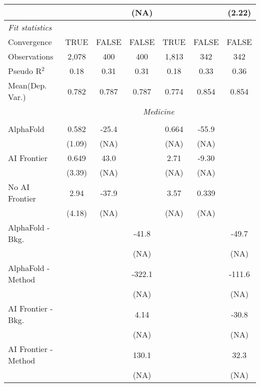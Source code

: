\begin{tabular}{lcccccc}
                           &               &              & (NA)  &               &              & (2.22)\\   
   \midrule
   \emph{Fit statistics}\\
   Convergence             &TRUE           & FALSE        & FALSE & TRUE          & FALSE        & FALSE\\  
   Observations            & 2,078         & 400          & 400   & 1,813         & 342          & 342\\  
   Pseudo R$^2$            & 0.18          & 0.31         & 0.31  & 0.18          & 0.33         & 0.36\\  
   
Mean(Dep. Var.) & 0.782 & 0.787 & 0.787 & 0.774 & 0.854 & 0.854 \\
 & \multicolumn{6}{c}{\textit{Medicine}} \\ \\
   AlphaFold               & 0.582  & -25.4 &        & 0.664 & -55.9 &   \\   
                           & (1.09) & (NA)  &        & (NA)  & (NA)  &   \\   
   AI Frontier             & 0.649  & 43.0  &        & 2.71  & -9.30 &   \\   
                           & (3.39) & (NA)  &        & (NA)  & (NA)  &   \\   
   No AI Frontier          & 2.94   & -37.9 &        & 3.57  & 0.339 &   \\   
                           & (4.18) & (NA)  &        & (NA)  & (NA)  &   \\   
   AlphaFold - Bkg.        &        &       & -41.8  &       &       & -49.7\\   
                           &        &       & (NA)   &       &       & (NA)\\   
   AlphaFold - Method      &        &       & -322.1 &       &       & -111.6\\   
                           &        &       & (NA)   &       &       & (NA)\\   
   AI Frontier - Bkg.      &        &       & 4.14   &       &       & -30.8\\   
                           &        &       & (NA)   &       &       & (NA)\\   
   AI Frontier - Method    &        &       & 130.1  &       &       & 32.3\\   
                           &        &       & (NA)   &       &       & (NA)\\   

\end{tabular}
